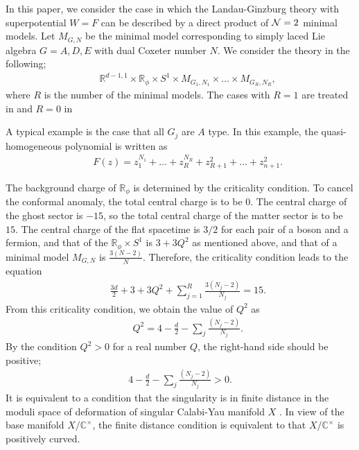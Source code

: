 \documentclass[a4paper,12pt]{article}
\numberwithin{equation}{section}
\newcommand{\Cx}{{\mathbb C}^{\times}}
\newcommand{\Ncal}{{\cal N}}
\newcommand{\Rb}{{\mathbb R}}
\begin{document}
In this paper, we consider the case in which the Landau-Ginzburg
theory with superpotential $W=F$ can be described by a direct product of
 $\Ncal=2$ minimal models.
Let $M_{G,N}$ be the minimal model
corresponding to simply laced Lie algebra 
$G=A,D,E$ with dual Coxeter number $N$.
We consider the theory in the following;
\begin{eqnarray*}
 && \Rb^{d-1,1}\times \Rb_{\phi} \times S^1 \times M_{G_1,N_1}\times
\dots\times M_{G_R,N_R},
\end{eqnarray*}
where $R$ is the number of the minimal models. The cases with $R=1$
are treated in \cite{ES0002} and $R=0$ in \cite{Miz0003,Kut9110}

A typical example is the case that all $G_j$ are $A$ type. In this example,
the quasi-homogeneous polynomial is written as
\begin{eqnarray*}
 && F(z)=z_1^{N_1}+\dots+z_{R}^{N_R}+z_{R+1}^{2}+\dots+z_{n+1}^2.
\end{eqnarray*}

The background charge of $\Rb_{\phi}$ is determined by the criticality
condition. To cancel the conformal
anomaly, the total central charge is to be $0$. The central charge of the
ghost sector is $-15$, so the total central charge of the 
matter sector is to be $15$. 
The central charge of the flat spacetime is $3/2$ for each pair
of a boson and a fermion, 
and that of the $\Rb_{\phi}\times S^1$ is $3+3Q^2$ as
mentioned above, and that of a minimal model $M_{G,N}$ is
$\frac{3(N-2)}{N}$. Therefore, the criticality
condition leads to the equation
\begin{eqnarray*}
 && \frac{3d}{2}+3+3Q^2+\sum_{j=1}^{R}\frac{3(N_j-2)}{N_j}=15.
\end{eqnarray*}
From this criticality condition, we obtain the value of $Q^2$ as
\begin{eqnarray}
 && Q^2=4-\frac d2 -\sum_j\frac{(N_j-2)}{N_j}.\label{CritCond1}
\end{eqnarray}
By the condition $Q^2>0$ for a real number $Q$,
the right-hand side should be positive;
\begin{eqnarray}
 4-\frac d2 -\sum_j\frac{(N_j-2)}{N_j}>0. \label{FDCondition}
\end{eqnarray}
It is equivalent to
a condition that the singularity is in finite distance in
the moduli space of deformation of singular Calabi-Yau
manifold $X$ \cite{GKP9907,GVW9906}. 
In view of the base manifold $X/\Cx$,
the finite distance condition is equivalent to that $X/\Cx$
is positively curved.
\end{document}
